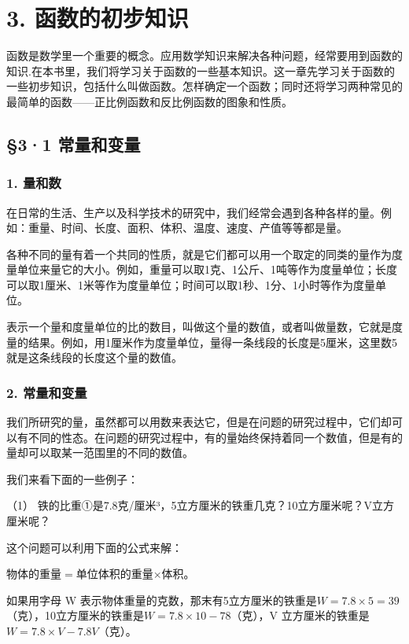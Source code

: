\chapter{3. 函数的初步知识}

函数是数学里一个重要的概念。应用数学知识来解决各种问题，经常要用到函数的知识.在本书里，我们将学习关于函数的一些基本知识。这一章先学习关于函数的一些初步知识，包括什么叫做函数。怎样确定一个函数；同时还将学习两种常见的最简单的函数------正比例函数和反比例函数的图象和性质。

\section{§3·1 常量和变量}

\subsection{1. 量和数}

在日常的生活、生产以及科学技术的研究中，我们经常会遇到各种各样的量。例如：重量、时间、长度、面积、体积、温度、速度、产值等等都是量。

各种不同的量有着一个共同的性质，就是它们都可以用一个取定的同类的量作为度量单位来量它的大小。例如，重量可以取1克、1公斤、1吨等作为度量单位；长度可以取1厘米、1米等作为度量单位；时间可以取1秒、1分、1小时等作为度量单位。

表示一个量和度量单位的比的数目，叫做这个量的数值，或者叫做量数，它就是度量的结果。例如，用1厘米作为度量单位，量得一条线段的长度是5厘米，这里数5就是这条线段的长度这个量的数值。

\subsection{2. 常量和变量}

我们所研究的量，虽然都可以用数来表达它，但是在问题的研究过程中，它们却可以有不同的性态。在问题的研究过程中，有的量始终保持着同一个数值，但是有的量却可以取某一范围里的不同的数值。

我们来看下面的一些例子：

（1）
铁的比重①是7.8克/厘米³，5立方厘米的铁重几克？10立方厘米呢？V立方厘米呢？

这个问题可以利用下面的公式来解：

物体的重量\(=\)单位体积的重量\(\times\)体积。

如果用字母 W
表示物体重量的克数，那末有5立方厘米的铁重是\(W = 7.8 \times 5 = 39\)（克），10立方厘米的铁重是\(W = 7.8\times 10 - 78\)（克），V
立方厘米的铁重是\(W = 7.8 \times V - 7.8V\)（克）。


